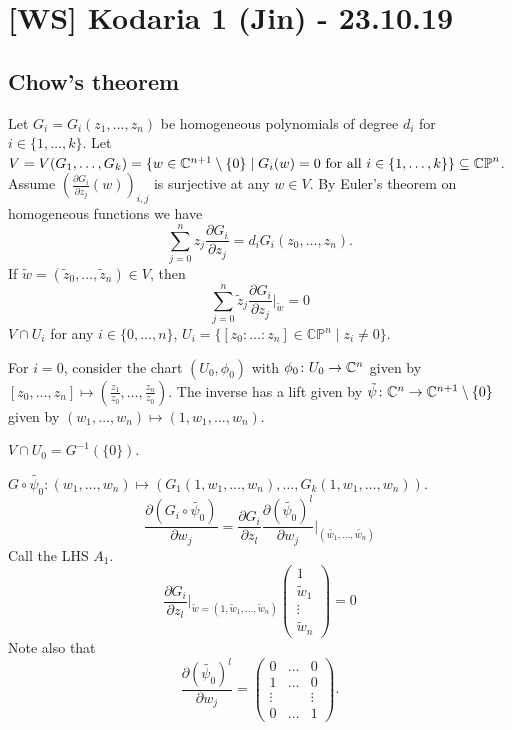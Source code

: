 \documentclass[A4paper, british, reqno]{amsart}
\theoremstyle{darkgreentheorem}
\theoremstyle{darkbluedefinition}
\theoremstyle{darkredexample}
\theoremstyle{remark}
\newcommand{\CP}{\mathbb{CP}}
\newcommand{\1}{\mathbbm{1}}
\begin{document}
\section{[WS] Kodaria 1 (Jin) - 23.10.19}

\subsection{Chow's theorem}

Let $G_{i}=G_{i}(z_{1},\ldots,z_{n})$ be homogeneous polynomials of degree $d_{i}$ for $i\in \{1,\ldots,k\}$.
Let $V=V(G_{1},\ldots,G_{k})=\{w\in \C^{n+1}\setminus \{0 \}\mid G_{i}(w)=0 \text{ for all }i\in \{1,\ldots,k\}\}\subseteq \CP^{n}$.
Assume $(\frac{\partial G_{i}}{\partial z_{j}}(w))_{i,j}$ is surjective at any $w\in V$.
By Euler's theorem on homogeneous functions we have
\[ \sum_{j=0}^{n}z_{j}\frac{\partial G_{i}}{\partial z_{j}}=d_{i}G_{i}(z_{0},\ldots,z_{n}). \]
If $\tilde{w}=(\tilde{z}_{0},\ldots,\tilde{z}_{n})\in V$, then
\[ \sum_{j=0}^{n}\tilde{z}_{j}\frac{\partial G_{i}}{\partial z_{j}}|_{\tilde{w}}=0\]
$V\cap U_{i}$ for any $i\in \{0,\ldots,n\}$, $U_{i}=\{[z_{0}:\ldots:z_{n}]\in \CP^{n}\mid z_{i}\neq 0\}$.

For $i=0$, consider the chart $(U_{0},\phi_{0})$ with $\phi_{0}\colon U_{0}\to \mathbb{C}^{n}$ given by $[z_{0},\ldots,z_{n}]\mapsto (\frac{z_{1}}{z_{0}},\ldots,\frac{z_{n}}{z_{0}})$.
The inverse has a lift given by $\tilde{\psi}\colon \mathbb{C}^{n}\to \mathbb{C}^{n+1}\setminus \{0\}$ given by $(w_{1},\ldots,w_{n})\mapsto (1,w_{1},\ldots,w_{n})$.
\begin{center}
\end{center}
$V\cap U_{0}=G^{-1}(\{0\})$.

$G\circ \tilde{\psi_{0}}\colon (w_{1},\ldots,w_{n})\mapsto (G_{1}(1,w_{1},\ldots,w_{n}),\ldots,G_{k}(1,w_{1},\ldots,w_{n}))$.
\[ \frac{\partial (G_{i}\circ \tilde{\psi_{0}})}{\partial w_{j}} = \frac{\partial G_{i}}{\partial z_{l}}\frac{\partial(\tilde{\psi_{0}})^{l}}{\partial w_{j}}|_{(\tilde{w_{1}},\ldots,\tilde{w_{n}})} \]
Call the LHS $A_{1}$.
\begin{equation}
    \frac{\partial G_{i}}{\partial z_{l}}|_{\tilde{w}=(1,\tilde{w}_{1},\ldots,\tilde{w}_{n})}\begin{pmatrix} 1 \\ \tilde{w}_{1} \\ \vdots \\ \tilde{w}_{n} \end{pmatrix} = 0
\end{equation}
Note also that
\[\frac{\partial (\tilde{\psi_{0}})^{l}}{\partial w_{j}}=\begin{pmatrix} 0 & \ldots & 0 \\ 1 & \ldots & 0\\ \vdots & & \vdots \\ 0 & \ldots & 1 \end{pmatrix}.\]
\end{document}
